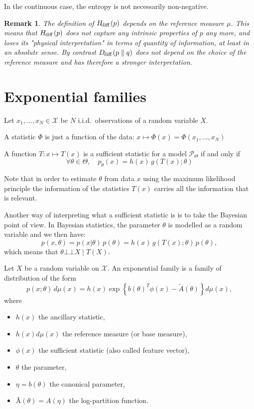 \documentclass[12pt]{report}
\def\indep{\bot\!\!\!\bot}
\newtheorem{remark}{Remark}[section]
\begin{document}
\begin{danger}
In the continuous case, the entropy is not necessarily non-negative.
\end{danger}

\begin{remark}
The definition of $H_{\text{\!diff\,}}(p)$ depends on the reference measure $\mu$. This means that $H_{\text{\!diff\,}}(p)$ does not capture any intrinsic properties of $p$ any more, and loses its "physical interpretation" in terms of quantity of information, at least in an absolute sense. By contrast $D_{\text{\!diff\,}}(p\parallel q)$ does not depend on the choice of the reference measure and has therefore a stronger interpretation. 
\end{remark}

\section{Exponential families}

Let $x_1,...,x_N\in \mathcal{X}$ be $N$ i.i.d.\ observations  of a random variable $X$.

\begin{definition}
A statistic $\Phi$ is just a function of the data: $x \mapsto \Phi(x) = \Phi(x_1, ..., x_N)$
\end{definition}

\begin{definition}
A function $T:x \mapsto T(x)$ is a sufficient statistic for a model $\mathcal{P}_{\Theta}$ if and only if
$$ \forall \theta \in \Theta, \quad p_{\theta} (x)=h(x)\,  g(T(x);\theta)$$
\end{definition}
Note that in order to estimate $\theta$ from data $x$ using the maximum likelihood principle the information of the statistics $T(x)$ carries all the information that is relevant.

Another way of interpreting what a sufficient statistic is is to take the Bayesian point of view. In Bayesian statistics, the parameter $\theta$ is modelled as a random variable and we then have:
$$p(x,\theta)=p(x\vert \theta) \, p(\theta)=h(x) \, g(T(x);\theta) \, p(\theta),$$
which means that $\theta \indep X \mid T(X)$.
\begin{definition}
Let $X$ be a random variable on $\mathcal{X}$. An exponential family is a family of distribution of the form
$$ p(x;\theta) \, d\mu (x)= h(x)\exp \left\lbrace b(\theta)^T \phi(x) - \tilde{A}(\theta) \right\rbrace d\mu (x),$$
where 
\begin{itemize}
\item $h(x)$ the ancillary statistic,
\item $h(x)d\mu (x)$ the reference measure (or base measure),
\item $\phi(x)$ the sufficient statistic (also called feature vector),
\item $\theta$ the parameter,
\item $\eta = b(\theta)$ the canonical parameter,
\item \~{A}$(\theta)=A(\eta)$ the log-partition function.
\end{itemize}
\end{definition}
\end{document}
